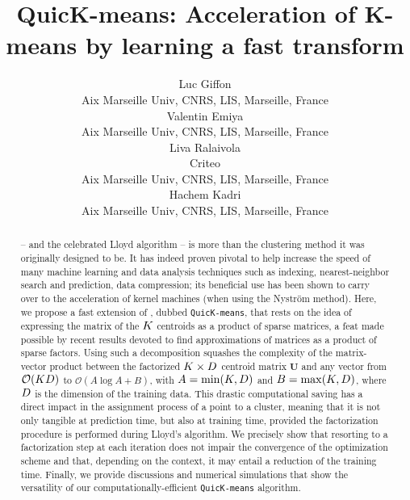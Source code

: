 \documentclass{article}
\title{QuicK-means: Acceleration of K-means by learning a fast transform}
\author{%
  Luc Giffon\\%
Aix Marseille Univ, CNRS, LIS, Marseille, France\\
   \And
   Valentin Emiya\\
Aix Marseille Univ, CNRS, LIS, Marseille, France\\
   \And
   Liva Ralaivola\\
  Criteo\\
  Aix Marseille Univ, CNRS, LIS, Marseille, France\\
   \And
   Hachem Kadri\\
Aix Marseille Univ, CNRS, LIS, Marseille, France\\
}
\begin{document}
\maketitle

\begin{abstract}
	
	\kmeans -- and the celebrated Lloyd algorithm -- is more than the clustering method it was originally designed to be. 
	It has indeed proven pivotal to help increase the speed of many machine learning and data analysis techniques such as indexing, nearest-neighbor search and prediction, data compression; its beneficial use has been shown to carry over to the acceleration of kernel machines (when using the Nyström method). 
	Here, we propose a fast extension of \kmeans, dubbed \texttt{QuicK-means}, that rests on the idea of expressing the matrix of the $K$ centroids as a product of sparse matrices, a feat made possible by recent results devoted to find approximations of matrices as a product of sparse factors. Using such a decomposition squashes the complexity of the matrix-vector product between the factorized $K \times D$ centroid matrix $\mathbf{U}$ and any vector from $\mathcal{O}(K D)$ to $\mathcal{O}(A \log A+B)$, with $A=\min (K, D)$ and $B=\max (K, D)$, where $D$ is the dimension of the training data. This drastic computational saving has a direct impact in the assignment process of a point to a cluster, meaning that it is not only tangible at prediction time, but also at training time, provided the factorization procedure is performed during Lloyd's algorithm. We precisely show that resorting to a factorization step at each iteration does not impair the convergence of the optimization scheme and that, depending on the context, it may entail a reduction of the training time. Finally, we provide discussions and numerical simulations that show the versatility of our computationally-efficient  \texttt{QuicK-means} algorithm. 
	

\end{abstract}
\end{document}

